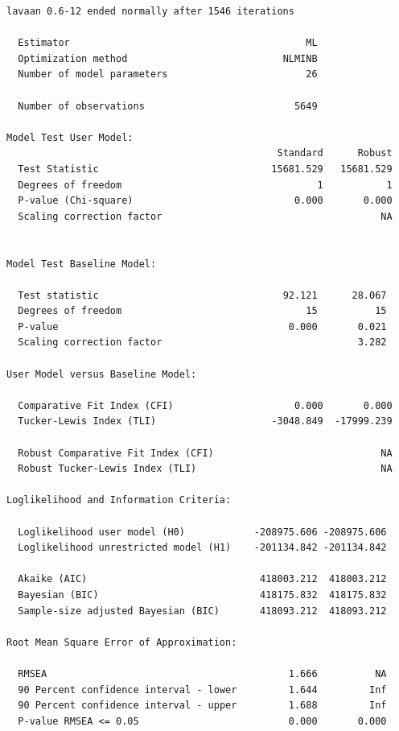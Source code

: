 \documentclass{article}
\begin{document}
\begin{verbatim}
lavaan 0.6-12 ended normally after 1546 iterations

  Estimator                                         ML
  Optimization method                           NLMINB
  Number of model parameters                        26

  Number of observations                          5649

Model Test User Model:
                                               Standard      Robust
  Test Statistic                              15681.529   15681.529
  Degrees of freedom                                  1           1
  P-value (Chi-square)                            0.000       0.000
  Scaling correction factor                                      NA
                                                                   

Model Test Baseline Model:

  Test statistic                                92.121      28.067
  Degrees of freedom                                15          15
  P-value                                        0.000       0.021
  Scaling correction factor                                  3.282

User Model versus Baseline Model:

  Comparative Fit Index (CFI)                     0.000       0.000
  Tucker-Lewis Index (TLI)                    -3048.849  -17999.239
                                                                   
  Robust Comparative Fit Index (CFI)                             NA
  Robust Tucker-Lewis Index (TLI)                                NA

Loglikelihood and Information Criteria:

  Loglikelihood user model (H0)            -208975.606 -208975.606
  Loglikelihood unrestricted model (H1)    -201134.842 -201134.842
                                                                  
  Akaike (AIC)                              418003.212  418003.212
  Bayesian (BIC)                            418175.832  418175.832
  Sample-size adjusted Bayesian (BIC)       418093.212  418093.212

Root Mean Square Error of Approximation:

  RMSEA                                          1.666          NA
  90 Percent confidence interval - lower         1.644         Inf
  90 Percent confidence interval - upper         1.688         Inf
  P-value RMSEA <= 0.05                          0.000       0.000
                                                                  

\end{verbatim}
\end{document}
